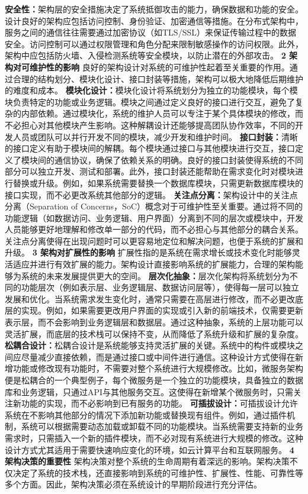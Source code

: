 {\textbf{安全性：}架构层的安全措施决定了系统抵御攻击的能力，确保数据和功能的安全。设计良好的架构应包括访问控制、身份验证、加密通信等措施。在分布式架构中，服务之间的通信往往需要通过加密协议（如TLS/SSL）来保证传输过程中的数据安全。访问控制可以通过权限管理和角色分配来限制敏感操作的访问权限。此外，架构中应包括防火墙、入侵检测系统等安全模块，以防止潜在的外部攻击。 \textbf{2 架构对可维护性的影响} 良好的架构设计对系统的可维护性起着至关重要的作用。通过合理的结构划分、模块化设计、接口封装等措施，架构可以极大地降低后期维护的难度和成本。 \textbf{模块化设计：}模块化设计将系统划分为独立的功能模块，每个模块负责特定的功能或业务逻辑。模块之间通过定义良好的接口进行交互，避免了复杂的内部依赖。通过模块化，系统的维护人员可以专注于某个具体模块的修改，而不必担心对其他模块产生影响。这种解耦设计还能够提高团队协作效率，不同的开发人员或团队可以并行开发不同的模块，减少开发和维护时间。 \textbf{接口封装：}清晰的接口定义有助于模块间的解耦。每个模块通过接口与其他模块进行交互，接口定义了模块间的通信协议，确保了依赖关系的明确。良好的接口封装使得系统的不同部分可以独立开发、测试和部署。此外，接口封装还能帮助在需求变化时对模块进行替换或升级。例如，如果系统需要替换一个数据库模块，只需更新数据库模块的接口实现，而不必更改系统其他部分的逻辑。 \textbf{关注点分离：}架构设计中的关注点分离（Separation of Concerns，SoC）概念对于可维护性至关重要。通过将不同的功能逻辑（如数据访问、业务逻辑、用户界面）分离到不同的层次或模块中，开发人员能够更好地理解和修改单一部分的代码，而不必担心与其他部分的耦合关系。关注点分离使得在出现问题时可以更容易地定位和解决问题，也便于系统的扩展和升级。 \textbf{3 架构对扩展性的影响} 扩展性指的是系统在需求增长或技术变化时能够灵活适应并进行有效扩展的能力。架构设计直接影响系统的扩展能力，合理的架构能够为系统的未来发展提供更大的空间。 \textbf{层次化抽象：}层次化架构将系统划分为不同的功能层次（例如表示层、业务逻辑层、数据访问层等），使得每一层可以独立发展和优化。当系统需求发生变化时，通常只需要在高层进行修改，而不必更改底层的实现。例如，如果需要更改用户界面的实现或引入新的前端技术，仅需要更新表示层，而不会影响到业务逻辑层和数据层。通过这种抽象，系统的上层功能可以灵活扩展，而底层的技术栈可以保持不变，从而降低了系统升级和扩展的复杂度。 \textbf{松耦合设计：}松耦合设计是系统能够支持灵活扩展的关键。系统中的构件或模块之间应尽量减少直接依赖，而是通过接口或中间件进行通信。这种设计方式使得在新增功能或修改现有功能时，不需要对整个系统进行大规模修改。比如，微服务架构便是松耦合的一个典型例子，每个微服务是一个独立的功能模块，具备独立的数据库和业务逻辑，只通过API与其他服务交互。这使得在新增某个微服务时，只需关注新功能的实现，而不必影响到已有服务的功能。 \textbf{可插拔设计：}可插拔设计允许系统在不影响其他部分的情况下添加新功能或替换现有组件。例如，通过插件机制，系统可以根据需要动态加载或卸载不同的功能模块。当系统需要支持新的业务需求时，只需插入一个新的插件模块，而不必对现有系统进行大规模的修改。这种设计方式尤其适用于需要快速响应变化的环境，如云计算平台和互联网服务。 \textbf{4 架构决策的重要性} 架构决策对整个系统的生命周期有着深远的影响。架构决策不仅决定了系统的技术栈，还直接影响到系统的可维护性、扩展性、性能、可靠性等多个方面。因此，架构决策必须在系统设计的早期阶段进行充分评估。 }
